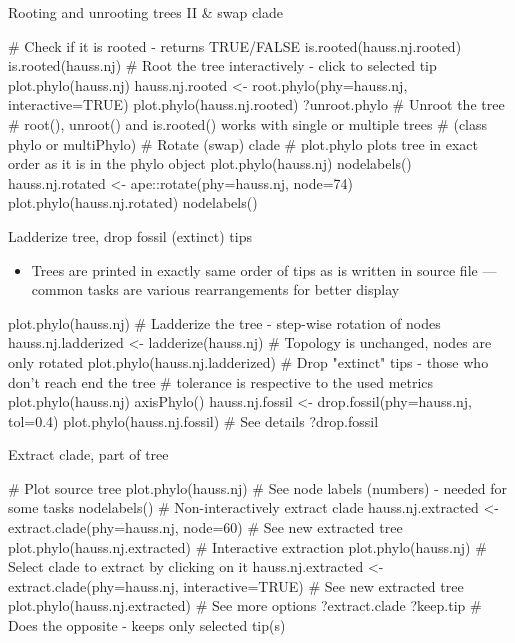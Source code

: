 \documentclass[compress, xelatex, 11pt, xcolor=svgnames, aspectratio=169, url={hyphens, lowtilde}]{beamer}
\begin{document}
\begin{frame}[fragile]{Rooting and unrooting trees II \& swap clade}
	\begin{spluscode}
    # Check if it is rooted - returns TRUE/FALSE
    is.rooted(hauss.nj.rooted)
    is.rooted(hauss.nj)
    # Root the tree interactively - click to selected tip
    plot.phylo(hauss.nj)
    hauss.nj.rooted <- root.phylo(phy=hauss.nj, interactive=TRUE)
    plot.phylo(hauss.nj.rooted)
    ?unroot.phylo # Unroot the tree
    # root(), unroot() and is.rooted() works with single or multiple trees
    # (class phylo or multiPhylo)
    # Rotate (swap) clade
    # plot.phylo plots tree in exact order as it is in the phylo object
    plot.phylo(hauss.nj)
    nodelabels()
    hauss.nj.rotated <- ape::rotate(phy=hauss.nj, node=74)
    plot.phylo(hauss.nj.rotated)
    nodelabels()
	\end{spluscode}
\end{frame}

\begin{frame}[fragile]{Ladderize tree, drop fossil (extinct) tips}
	\begin{itemize}
		\item Trees are printed in exactly same order of tips as is written in source file --- common tasks are various rearrangements for better display
	\end{itemize}
	\begin{spluscode}
    plot.phylo(hauss.nj)
    # Ladderize the tree - step-wise rotation of nodes
    hauss.nj.ladderized <- ladderize(hauss.nj)
    # Topology is unchanged, nodes are only rotated
    plot.phylo(hauss.nj.ladderized)
    # Drop "extinct" tips - those who don't reach end the tree
    # tolerance is respective to the used metrics
    plot.phylo(hauss.nj)
    axisPhylo()
    hauss.nj.fossil <- drop.fossil(phy=hauss.nj, tol=0.4)
    plot.phylo(hauss.nj.fossil)
    # See details
    ?drop.fossil
	\end{spluscode}
\end{frame}

\begin{frame}[fragile]{Extract clade, part of tree}
	\begin{spluscode}
    # Plot source tree
    plot.phylo(hauss.nj)
    # See node labels (numbers) - needed for some tasks
    nodelabels()
    # Non-interactively extract clade
    hauss.nj.extracted <- extract.clade(phy=hauss.nj, node=60)
    # See new extracted tree
    plot.phylo(hauss.nj.extracted)
    # Interactive extraction
    plot.phylo(hauss.nj)
    # Select clade to extract by clicking on it
    hauss.nj.extracted <- extract.clade(phy=hauss.nj, interactive=TRUE)
    # See new extracted tree
    plot.phylo(hauss.nj.extracted)
    # See more options
    ?extract.clade
    ?keep.tip # Does the opposite - keeps only selected tip(s)
	\end{spluscode}
\end{frame}
\end{document}
